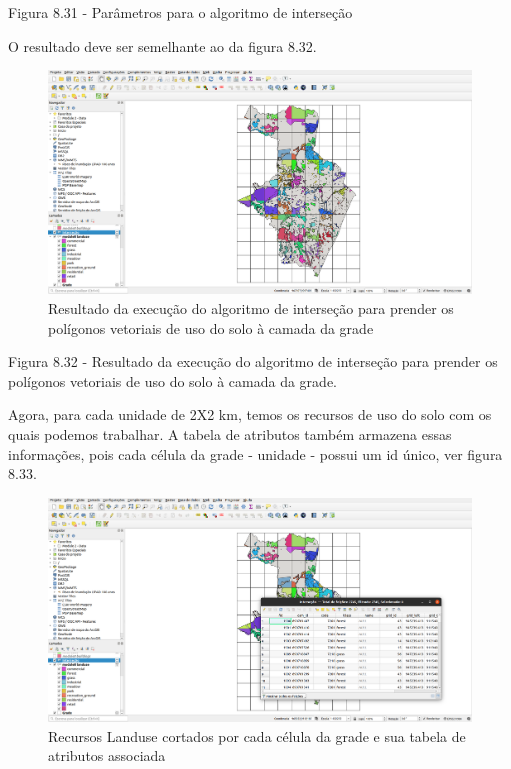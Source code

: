 \documentclass[
]{book}
\begin{document}
Figura 8.31 - Parâmetros para o algoritmo de interseção

O resultado deve ser semelhante ao da figura 8.32.

\begin{figure}
\centering
\includegraphics{media/modulo8/fig832.png}
\caption{Resultado da execução do algoritmo de interseção para prender os polígonos vetoriais de uso do solo à camada da grade}
\end{figure}

Figura 8.32 - Resultado da execução do algoritmo de interseção para prender os polígonos vetoriais de uso do solo à camada da grade.

Agora, para cada unidade de 2X2 km, temos os recursos de uso do solo com os quais podemos trabalhar. A tabela de atributos também armazena essas informações, pois cada célula da grade - unidade - possui um id único, ver figura 8.33.

\begin{figure}
\centering
\includegraphics{media/modulo8/fig833.png}
\caption{Recursos Landuse cortados por cada célula da grade e sua tabela de atributos associada}
\end{figure}
\end{document}
